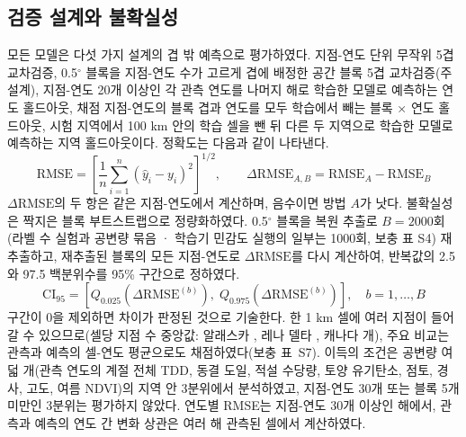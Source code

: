 
\subsection{검증 설계와 불확실성}
모든 모델은 다섯 가지 설계의 겹 밖 예측으로 평가하였다\cite{Roberts2017,Ploton2020}. 지점-연도 단위 무작위 5겹 교차검증, 0.5$^\circ$ 블록을 지점-연도 수가 고르게 겹에 배정한 공간 블록 5겹 교차검증(주 설계), 지점-연도 20개 이상인 각 관측 연도를 나머지 해로 학습한 모델로 예측하는 연도 홀드아웃, 채점 지점-연도의 블록 겹과 연도를 모두 학습에서 빼는 블록 × 연도 홀드아웃, 시험 지역에서 100 km 안의 학습 셀을 뺀 뒤 다른 두 지역으로 학습한 모델로 예측하는 지역 홀드아웃이다. 정확도는 다음과 같이 나타낸다.
\begin{equation}
\mathrm{RMSE} = \left[ \frac{1}{n} \sum_{i=1}^{n} \left( \hat{y}_i - y_i \right)^{2} \right]^{1/2}, \qquad \Delta\mathrm{RMSE}_{A,B} = \mathrm{RMSE}_{A} - \mathrm{RMSE}_{B}
\label{eq:rmse}
\end{equation}
$\Delta\mathrm{RMSE}$의 두 항은 같은 지점-연도에서 계산하며, 음수이면 방법 $A$가 낫다. 불확실성은 짝지은 블록 부트스트랩으로 정량화하였다. 0.5$^\circ$ 블록을 복원 추출로 $B=2000$회(라벨 수 실험과 공변량 묶음 · 학습기 민감도 실행의 일부는 1000회, 보충 표 S4) 재추출하고, 재추출된 블록의 모든 지점-연도로 $\Delta\mathrm{RMSE}$를 다시 계산하여, 반복값의 2.5와 97.5 백분위수를 95\% 구간으로 정하였다.
\begin{equation}
\mathrm{CI}_{95} = \left[ Q_{0.025}\!\left( \Delta\mathrm{RMSE}^{(b)} \right),\; Q_{0.975}\!\left( \Delta\mathrm{RMSE}^{(b)} \right) \right], \quad b = 1,\ldots,B
\label{eq:ci}
\end{equation}
구간이 0을 제외하면 차이가 판정된 것으로 기술한다. 한 1 km 셀에 여러 지점이 들어갈 수 있으므로(셀당 지점 수 중앙값: 알래스카 \ncySitesMedAk, 레나 델타 \ncySitesMedLe, 캐나다 \ncySitesMedCa{}개), 주요 비교는 관측과 예측의 셀-연도 평균으로도 채점하였다(보충 표~S7). 이득의 조건은 공변량 여덟 개(관측 연도의 계절 전체 TDD, 동결 도일, 적설 수당량, 토양 유기탄소, 점토, 경사, 고도, 여름 NDVI)의 지역 안 3분위에서 분석하였고, 지점-연도 30개 또는 블록 5개 미만인 3분위는 평가하지 않았다. 연도별 RMSE는 지점-연도 30개 이상인 해에서, 관측과 예측의 연도 간 변화 상관은 여러 해 관측된 셀에서 계산하였다.

